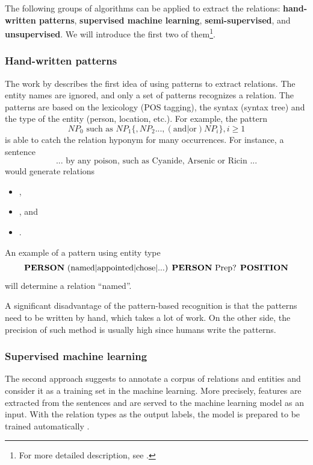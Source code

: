 \documentclass[
  digital, %
  notable,   %
  nolof,     %
  nolot,     %
]{fithesis3}
\begin{document}
The following groups of algorithms can be applied to extract the relations: \textbf{hand-written patterns}, \textbf{supervised machine learning}, \textbf{semi-supervised}, and \textbf{unsupervised}.
We will introduce the first two of them\footnote{For more detailed description, see  \cite{jurafsky2014speech}.}.

\subsubsection{\textbf{Hand-written patterns}}
The work  by \citeauthor{hearst1992automatic} \cite{hearst1992automatic} describes the first idea of using patterns to extract relations.
The entity names are ignored, and only a set of patterns recognizes a relation.
The patterns are based on the lexicology (POS tagging), the syntax (syntax tree) and the type of the entity (person, location, etc.).
For example, the pattern \cite[sec. 21.2]{jurafsky2014speech}
$$
NP_0\text{ such as }NP_1 \{, NP_2 ..., (\text{and|or})NP_i \}, i \geq 1
$$
is able to catch the relation hyponym for many occurrences. For instance, a sentence
$$
\text{... by any poison, such as Cyanide, Arsenic or Ricin ...}
$$
would generate relations 
\begin{itemize}
\item <poison, hyponym of, Cyanide>,
\item <poison, hyponym of, Arsenic>, and
\item <poison, hyponym of, Ricin>.
\end{itemize}
An example of a pattern using entity type 
$$
\text{\textbf{PERSON} (named|appointed|chose|...) \textbf{PERSON} Prep? \textbf{POSITION}}
$$
will determine a relation ``named''\cite[sec. 21.2]{jurafsky2014speech}. 

A significant disadvantage of the pattern-based recognition is that the patterns need to be written by hand, which takes a lot of work. On the other side, the precision of such method is usually high since humans write the patterns.

\subsubsection{\textbf{Supervised machine learning}}
The second approach suggests to annotate a corpus of relations and entities and consider it as a training set in the machine learning.
More precisely, features are extracted from the sentences and are served to the machine learning model as an input.
With the relation types as the output labels, the model is prepared to be trained automatically
\cite[sec 21.2]{jurafsky2014speech}.
\end{document}
